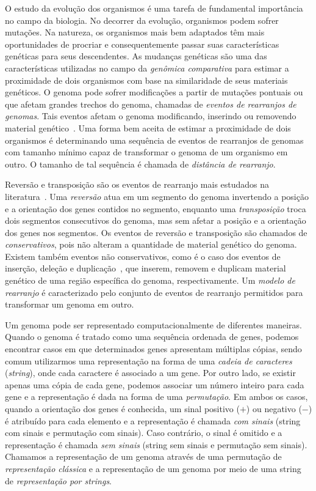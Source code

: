 
O estudo da evolução dos organismos é uma tarefa de fundamental importância no campo da biologia. No decorrer da evolução, organismos podem sofrer mutações. Na natureza, os organismos mais bem adaptados têm mais oportunidades de procriar e consequentemente passar suas características genéticas para seus descendentes. As mudanças genéticas são uma das características utilizadas no campo da \emph{genômica comparativa} para estimar a proximidade de dois organismos com base na similaridade de seus materiais genéticos. O genoma pode sofrer modificações a partir de mutações pontuais ou que afetam grandes trechos do genoma, chamadas de \emph{eventos de rearranjos de genomas}. Tais eventos afetam o genoma modificando, inserindo ou removendo material genético~\cite{2009-fertin-etal}. Uma forma bem aceita de estimar a proximidade de dois organismos é determinando uma sequência de eventos de rearranjos de genomas com tamanho mínimo capaz de transformar o genoma de um organismo em outro. O tamanho de tal sequência é chamada de \emph{distância de rearranjo}.

Reversão e transposição são os eventos de rearranjo mais estudados na literatura~\cite{1999-hannenhalli-pevzner,1999b-caprara,2012-bulteau-etal,2019b-oliveira-etal}. Uma \emph{reversão} atua em um segmento do genoma invertendo a posição e a orientação dos genes contidos no segmento, enquanto uma \emph{transposição} troca dois segmentos consecutivos do genoma, mas sem afetar a posição e a orientação dos genes nos segmentos. Os eventos de reversão e transposição são chamados de \emph{conservativos}, pois não alteram a quantidade de material genético do genoma. Existem também eventos não conservativos, como é o caso dos eventos de inserção, deleção e duplicação~\cite{2013-willing-etal,2012-elmabrouk-sankoff,2008-kahn-raphael,2020-mane-etal,2009-bader}, que inserem, removem e duplicam material genético de uma região específica do genoma, respectivamente. Um \emph{modelo de rearranjo} é caracterizado pelo conjunto de eventos de rearranjo permitidos para transformar um genoma em outro.

Um genoma pode ser representado computacionalmente de diferentes maneiras. Quan\-do o genoma é tratado como uma sequência ordenada de genes, podemos encontrar casos em que determinados genes apresentam múltiplas cópias, sendo comum utilizarmos uma representação na forma de uma \emph{cadeia de caracteres} (\emph{string}), onde cada caractere é associado a um gene. Por outro lado, se existir apenas uma cópia de cada gene, podemos associar um número inteiro para cada gene e a representação é dada na forma de uma \emph{permutação}. Em ambos os casos, quando a orientação dos genes é conhecida, um sinal positivo ($+$) ou negativo ($-$) é atribuído para cada elemento e a representação é chamada \emph{com sinais} (string com sinais e permutação com sinais). Caso contrário, o sinal é omitido e a representação é chamada \emph{sem sinais} (string sem sinais e permutação sem sinais). Chamamos a representação de um genoma através de uma permutação de \emph{representação clássica} e a representação de um genoma por meio de uma string de \emph{representação por strings}.


